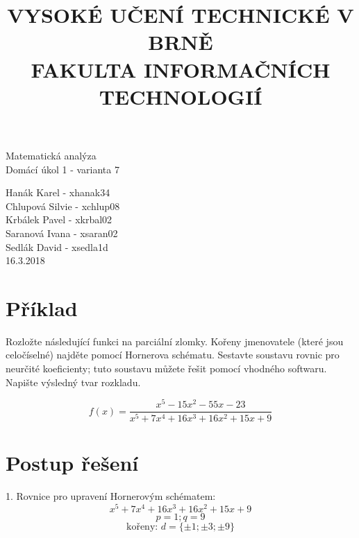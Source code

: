 \documentclass[a4paper, 11pt]{article}
\begin{document}
	\thispagestyle{empty}
	\title{VYSOKÉ UČENÍ TECHNICKÉ V BRNĚ \\ FAKULTA INFORMAČNÍCH TECHNOLOGIÍ}
	
	\date{}
	\maketitle
	\thispagestyle{empty}
	\begin{center}
	\huge{Matematická analýza}\\
	\Large{Domácí úkol 1 - varianta 7}
	
	\vspace{8cm}
	Hanák Karel - xhanak34\\
 	Chlupová Silvie - xchlup08\\
 	Krbálek Pavel - xkrbal02\\
 	Saranová Ivana - xsaran02\\	
 	Sedlák David - xsedla1d\\
 	\vspace{2cm}
	\textsc{16.3.2018}
	\end{center}	
	
	\newpage
	
	\setcounter{page}{1}
	 \section{Příklad}
	
	Rozložte následující funkci na parciální zlomky. Kořeny jmenovatele (které jsou celočíselné) najděte
	pomocí Hornerova schématu. Sestavte soustavu rovnic pro neurčité koeficienty; tuto soustavu můžete
	řešit pomocí vhodného softwaru. Napište výsledný tvar rozkladu. 
	
	\[f(x) = \frac{x^5-15x^2-55x-23}{x^5+7x^4+16x^3+16x^2+15x+9}\]
	
	
	\bigskip
	
	\section*{Postup řešení}
	
	1. Rovnice pro upravení Hornerovým schématem:
	\begin{equation}
	x^5+7x^4+16x^3+16x^2+15x+9 
	\end{equation}
	\begin{equation}
	p = 1; q = 9 
	\end{equation}
	\begin{equation}
	\text{kořeny: } d = \{\pm 1; \pm 3 ; \pm 9\}
	\end{equation}
	
\end{document}
